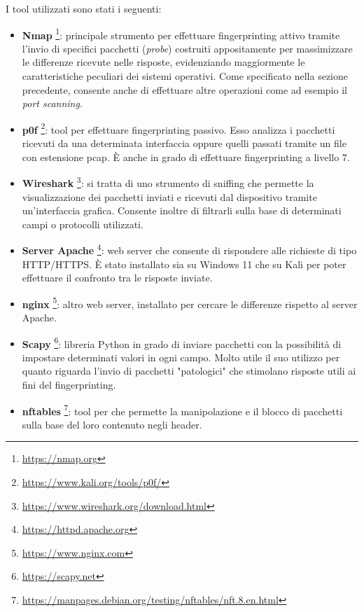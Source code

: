 I tool utilizzati sono stati i seguenti:
\begin{itemize}
	\item \textbf{Nmap} \footnote{\url{https://nmap.org}}: principale strumento per effettuare fingerprinting attivo tramite l'invio di specifici pacchetti (\textit{probe}) costruiti appositamente per massimizzare le differenze ricevute nelle risposte, evidenziando maggiormente le caratteristiche peculiari dei sistemi operativi. Come specificato nella sezione precedente, consente anche di effettuare altre operazioni come ad esempio il \textit{port scanning}.
	\item \textbf{p0f} \footnote{\url{https://www.kali.org/tools/p0f/}}: tool per effettuare fingerprinting passivo. Esso analizza i pacchetti ricevuti da una determinata interfaccia oppure quelli passati tramite un file con estensione pcap. È anche in grado di effettuare fingerprinting a livello 7.
	\item \textbf{Wireshark} \footnote{\url{https://www.wireshark.org/download.html}}: si tratta di uno strumento di sniffing che permette la visualizzazione dei pacchetti inviati e ricevuti dal dispositivo tramite un'interfaccia grafica. Consente inoltre di filtrarli sulla base di determinati campi o protocolli utilizzati.
	\item \textbf{Server Apache} \footnote{\url{https://httpd.apache.org}}: web server che consente di rispondere alle richieste di tipo HTTP/HTTPS. È stato installato sia su Windows 11 che su Kali per poter effettuare il confronto tra le risposte inviate.
	\item \textbf{nginx} \footnote{\url{https://www.nginx.com}}: altro web server, installato per cercare le differenze rispetto al server Apache.
	\item \textbf{Scapy} \footnote{\url{https://scapy.net}}: libreria Python in grado di inviare pacchetti con la possibilità di impostare determinati valori in ogni campo. Molto utile il suo utilizzo per quanto riguarda l'invio di pacchetti "patologici" che stimolano risposte utili ai fini del fingerprinting.
	\item \textbf{nftables} \footnote{\url{https://manpages.debian.org/testing/nftables/nft.8.en.html}}: tool per che permette la manipolazione e il blocco di pacchetti sulla base del loro contenuto negli header.
\end{itemize}



